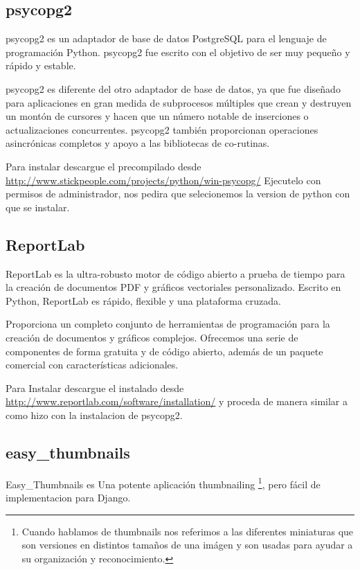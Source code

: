 \subsection{psycopg2}

psycopg2 es un adaptador de base de datos PostgreSQL para el lenguaje de
programación Python. psycopg2 fue escrito con el objetivo de ser muy pequeño
y rápido y estable. 

psycopg2 es diferente del otro adaptador de base de datos, ya que fue diseñado
para aplicaciones en gran medida de subprocesos múltiples que crean y destruyen
un montón de cursores y hacen que un número notable de inserciones o
actualizaciones concurrentes. psycopg2 también proporcionan operaciones
asincrónicas completos y apoyo a las bibliotecas de co-rutinas. 

Para instalar descargue el precompilado desde \url{http://www.stickpeople.com/projects/python/win-psycopg/}
Ejecutelo con permisos de administrador, nos pedira que selecionemos la version
de python con que se instalar.

\subsection{ReportLab}

ReportLab es la ultra-robusto motor de código abierto a prueba de tiempo para
la creación de documentos PDF y gráficos vectoriales personalizado. Escrito en
Python, ReportLab es rápido, flexible y una plataforma cruzada.
 
Proporciona un completo conjunto de herramientas de programación para la
creación de documentos y gráficos complejos. Ofrecemos una serie de componentes
 de forma gratuita y de código abierto, además de un paquete comercial con
características adicionales.

Para Instalar descargue el instalado desde \url{http://www.reportlab.com/software/installation/}
y proceda de manera similar a como hizo con la instalacion de psycopg2.


\subsection{easy\_thumbnails}

Easy\_Thumbnails es Una potente aplicación thumbnailing \footnote{Cuando hablamos de thumbnails 
nos referimos a las diferentes miniaturas que son versiones en distintos tamaños
 de una imágen y son usadas para ayudar a su organización y reconocimiento.},
pero fácil de implementacion para Django.

